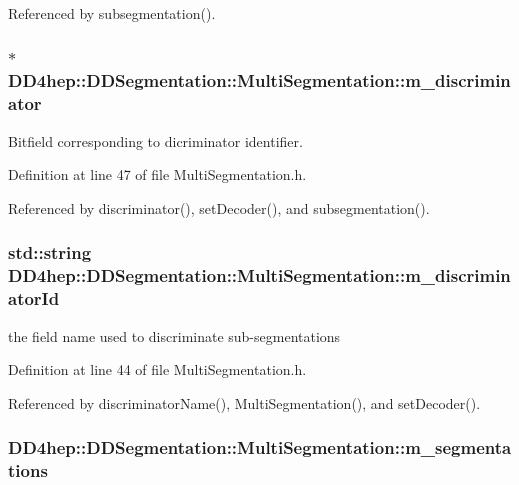 Referenced by subsegmentation().\hypertarget{class_d_d4hep_1_1_d_d_segmentation_1_1_multi_segmentation_a5d86769ef20468667fbc44fc6d8b2a4e}{
\subsubsection[{m\_\-discriminator}]{$\ast$ {\bf DD4hep::DDSegmentation::MultiSegmentation::m\_\-discriminator}}}
\label{class_d_d4hep_1_1_d_d_segmentation_1_1_multi_segmentation_a5d86769ef20468667fbc44fc6d8b2a4e}


Bitfield corresponding to dicriminator identifier. 

Definition at line 47 of file MultiSegmentation.h.

Referenced by discriminator(), setDecoder(), and subsegmentation().\hypertarget{class_d_d4hep_1_1_d_d_segmentation_1_1_multi_segmentation_a922d7825b1c14d0724bfd1711082b943}{
\subsubsection[{m\_\-discriminatorId}]{\setlength{\rightskip}{0pt plus 5cm}std::string {\bf DD4hep::DDSegmentation::MultiSegmentation::m\_\-discriminatorId}}}
\label{class_d_d4hep_1_1_d_d_segmentation_1_1_multi_segmentation_a922d7825b1c14d0724bfd1711082b943}


the field name used to discriminate sub-\/segmentations 

Definition at line 44 of file MultiSegmentation.h.

Referenced by discriminatorName(), MultiSegmentation(), and setDecoder().\hypertarget{class_d_d4hep_1_1_d_d_segmentation_1_1_multi_segmentation_a9af45d1b08e9f34c17ea27dcdf2e1019}{
\subsubsection[{m\_\-segmentations}]{ {\bf DD4hep::DDSegmentation::MultiSegmentation::m\_\-segmentations}}}
\label{class_d_d4hep_1_1_d_d_segmentation_1_1_multi_segmentation_a9af45d1b08e9f34c17ea27dcdf2e1019}


